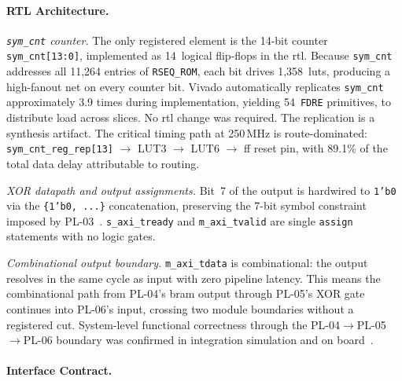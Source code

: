 
\FloatBarrier
\paragraph{RTL Architecture.}

\textit{\texttt{sym\_cnt} counter.}
The only registered element is the 14-bit counter \texttt{sym\_cnt[13:0]},
implemented as 14~logical flip-flops in the \ac{rtl}.
Because \texttt{sym\_cnt} addresses all 11{,}264 entries of
\texttt{RSEQ\_ROM}, each bit drives 1{,}358~\acp{lut}, producing a
high-fanout net on every counter bit.
Vivado automatically replicates \texttt{sym\_cnt} approximately 3.9 times
during implementation, yielding 54~\texttt{FDRE} primitives, to distribute
load across slices.
No \ac{rtl} change was required. The replication is a synthesis artifact.
The critical timing path at 250\,MHz is route-dominated:
\texttt{sym\_cnt\_reg\_rep[13]} $\to$ LUT3 $\to$ LUT6 $\to$ \ac{ff}
reset pin, with 89.1\% of the total data delay attributable to routing.

\textit{XOR datapath and output assignments.}
Bit~7 of the output is hardwired to \texttt{1'b0} via the
\texttt{\{1'b0, ...\}} concatenation, preserving the 7-bit symbol
constraint imposed by PL-03~\cite{ITU_J83}.
\texttt{s\_axi\_tready} and \texttt{m\_axi\_tvalid} are single
\texttt{assign} statements with no logic gates.

\textit{Combinational output boundary.}
\texttt{m\_axi\_tdata} is combinational: the output resolves in the same
cycle as input with zero pipeline latency.
This means the combinational path from PL-04's \ac{bram} output through
PL-05's XOR gate continues into PL-06's input, crossing two module
boundaries without a registered cut.
System-level functional correctness through the
PL-04$\to$PL-05$\to$PL-06 boundary was confirmed in integration
simulation and on board~\cite{PYNQ_DOC}.

\FloatBarrier


\paragraph{Interface Contract.}

